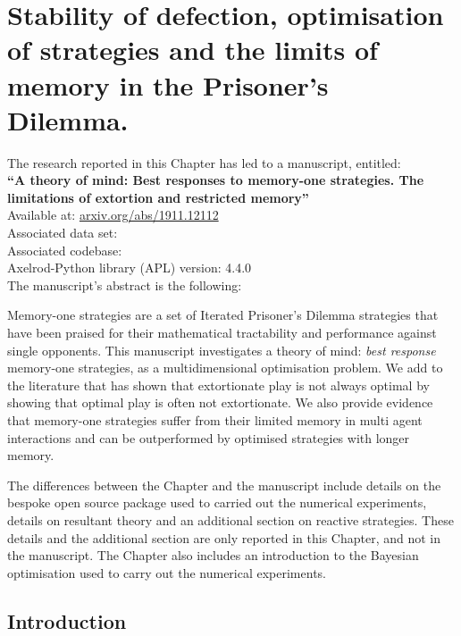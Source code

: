 
\chapter{Stability of defection, optimisation of strategies and the limits of
       memory in the Prisoner's Dilemma.}\label{chapter:memory_one}

\begin{center}
    The research reported in this Chapter has led to a manuscript, entitled: \\
    \textbf{``A theory of mind: Best responses to memory-one strategies.
    The limitations of extortion and restricted memory''} \\
    Available at: \url{arxiv.org/abs/1911.12112} \\
    Associated data set: \cite{glynatsi2019} \\
    Associated codebase: \cite{Glynatsi2019_opt_mo} \\
    Axelrod-Python library (APL) version: 4.4.0 \\ \vspace{.5cm}
    The manuscript's abstract is the following:
\end{center}

Memory-one strategies are a set of Iterated Prisoner's Dilemma strategies that
have been praised for their mathematical tractability and performance against
single opponents. This manuscript investigates a theory of mind: \textit{best
response} memory-one strategies, as a multidimensional optimisation problem. We
add to the literature that has shown that extortionate play is not always
optimal by showing that optimal play is often not extortionate. We also provide
evidence that memory-one strategies suffer from their limited memory in multi
agent interactions and can be outperformed by optimised strategies with longer
memory.

\hrulefill

The differences between the Chapter and the manuscript include details on the
bespoke open source package used to carried out the numerical experiments,
details on resultant theory and an additional section on reactive strategies.
These details and the additional section are only reported in this Chapter, and
not in the manuscript. The Chapter also includes an introduction to the
Bayesian optimisation used to carry out the numerical experiments.

\section{Introduction}\label{section:mem_one_introduction}

